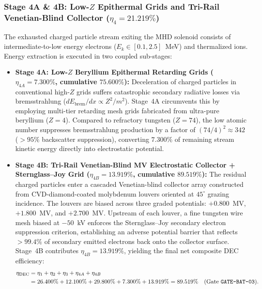 \documentclass[11pt,onecolumn]{article}
\begin{document}
\subsubsection{Stage 4A \& 4B: Low-\texorpdfstring{$Z$}{Z} Epithermal Grids and Tri-Rail Venetian-Blind Collector (\texorpdfstring{$\eta_4 = 21.219\%$}{eta4 = 21.219\%})}
The exhausted charged particle stream exiting the MHD solenoid consists of intermediate-to-low energy electrons ($E_k \in [0.1, 2.5]$~MeV) and thermalized ions. Energy extraction is executed in two coupled sub-stages:
\begin{itemize}
    \item \textbf{Stage 4A: Low-$Z$ Beryllium Epithermal Retarding Grids ($\eta_{4A} = 7.300\%$, cumulative $75.600\%$):} Deceleration of charged particles in conventional high-$Z$ grids suffers catastrophic secondary radiative losses via bremsstrahlung ($dE_{\text{brem}}/dx \propto Z^2/m^2$). Stage~4A circumvents this by employing multi-tier retarding mesh grids fabricated from ultra-pure beryllium ($Z = 4$). Compared to refractory tungsten ($Z = 74$), the low atomic number suppresses bremsstrahlung production by a factor of $(74/4)^2 \approx 342$ ($>95\%$ backscatter suppression), converting $7.300\%$ of remaining stream kinetic energy directly into electrostatic potential.
    \item \textbf{Stage 4B: Tri-Rail Venetian-Blind MV Electrostatic Collector + Sternglass--Joy Grid ($\eta_{4B} = 13.919\%$, cumulative $89.519\%$):} The residual charged particles enter a cascaded Venetian-blind collector array constructed from CVD-diamond-coated molybdenum louvers oriented at $45^\circ$ grazing incidence. The louvers are biased across three graded potentials: $+0.800$~MV, $+1.800$~MV, and $+2.700$~MV. Upstream of each louver, a fine tungsten wire mesh biased at $-50$~kV enforces the Sternglass--Joy secondary electron suppression criterion, establishing an adverse potential barrier that reflects $>99.4\%$ of secondary emitted electrons back onto the collector surface. Stage~4B contributes $\eta_{4B} = 13.919\%$, yielding the final net composite DEC efficiency:
    \begin{equation}
    \begin{split}
    \eta_{\text{DEC}} &= \eta_1 + \eta_2 + \eta_3 + \eta_{4A} + \eta_{4B} \\
    &= 26.400\% + 12.100\% + 29.800\% + 7.300\% + 13.919\% = 89.519\% \quad (\text{Gate \texttt{GATE-BAT-03}}).
    \end{split}
    \end{equation}
\end{itemize}
\end{document}
